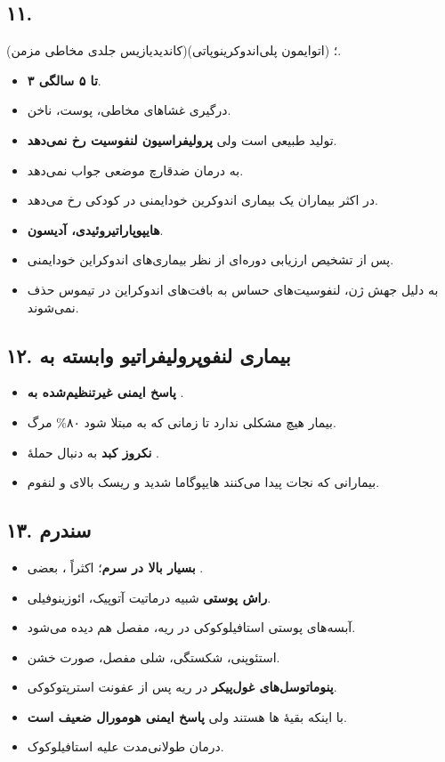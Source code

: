 \documentclass[12pt,a4paper]{article}
\begin{document}
\subsection*{۱۱. }
(کاندیدیازیس جلدی مخاطی مزمن)؛ (اتوایمون پلی‌اندوکرینوپاتی).
\begin{itemize}
\item \textbf{۳ تا ۵ سالگی}.
\item درگیری غشاهای مخاطی، پوست، ناخن.
\item تولید  طبیعی است ولی \textbf{پرولیفراسیون لنفوسیت رخ نمی‌دهد}.
\item به درمان ضدقارچ موضعی جواب نمی‌دهد.
\item در اکثر بیماران یک بیماری اندوکرین خودایمنی در کودکی رخ می‌دهد.
\item \textbf{هایپوپاراتیروئیدی، آدیسون}.
\item پس از تشخیص \LDarrow{} ارزیابی دوره‌ای از نظر بیماری‌های اندوکراین خودایمنی.
\item به دلیل جهش ژن، لنفوسیت‌های حساس به بافت‌های اندوکراین در تیموس حذف نمی‌شوند.
\end{itemize}

\subsection*{۱۲. بیماری لنفوپرولیفراتیو وابسته به }
\begin{itemize}
\item \textbf{پاسخ ایمنی غیرتنظیم‌شده به }.
\item بیمار هیچ مشکلی ندارد تا زمانی که به  مبتلا شود
\LDarrow{} ۸۰\% مرگ.
\item \textbf{نکروز کبد} به دنبال حملهٔ .
\item بیمارانی که نجات پیدا می‌کنند \LDarrow{} هایپوگاما شدید و ریسک بالای
 و لنفوم.
\end{itemize}

\subsection*{۱۳. سندرم }
\begin{itemize}
\item \textbf{ بسیار بالا در سرم}؛ اکثراً ، بعضی .
\item \textbf{راش پوستی} شبیه درماتیت آتوپیک، ائوزینوفیلی.
\item آبسه‌های پوستی استافیلوکوکی در ریه، مفصل هم دیده می‌شود.
\item استئوپنی، شکستگی، شلی مفصل، صورت خشن.
\item \textbf{پنوماتوسل‌های غول‌پیکر} در ریه پس از عفونت استرپتوکوکی.
\item با اینکه بقیهٔ ها  هستند ولی \textbf{پاسخ ایمنی هومورال ضعیف است}.
\item درمان  طولانی‌مدت علیه استافیلوکوک.
\end{itemize}
\end{document}
